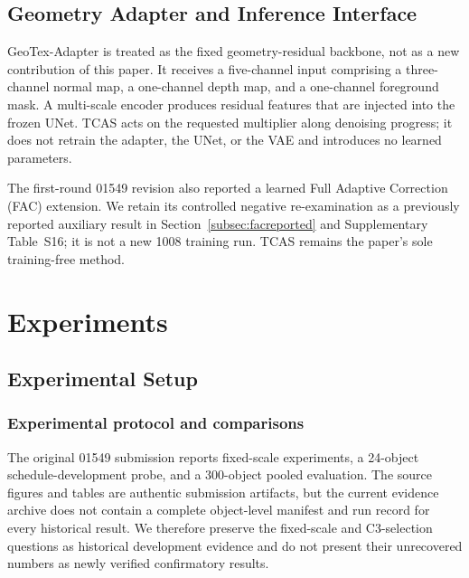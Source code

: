 \documentclass[times,twocolumn,final]{elsarticle}
\begin{document}
\subsection{Geometry Adapter and Inference Interface}
\label{subsec:adapterimpl}

GeoTex-Adapter is treated as the fixed geometry-residual backbone, not as a new contribution of this paper. It receives a five-channel input comprising a three-channel normal map, a one-channel depth map, and a one-channel foreground mask. A multi-scale encoder produces residual features that are injected into the frozen UNet. TCAS acts on the requested multiplier along denoising progress; it does not retrain the adapter, the UNet, or the VAE and introduces no learned parameters.

The first-round 01549 revision also reported a learned Full Adaptive Correction (FAC) extension. We retain its controlled negative re-examination as a previously reported auxiliary result in Section~\ref{subsec:facreported} and Supplementary Table~S16; it is not a new 1008 training run. TCAS remains the paper's sole training-free method.

\section{Experiments}
\label{sec:experiments}

\subsection{Experimental Setup}
\label{subsec:setup}

\subsubsection{Experimental protocol and comparisons}

The original 01549 submission reports fixed-scale experiments, a 24-object schedule-development probe, and a 300-object pooled evaluation. The source figures and tables are authentic submission artifacts, but the current evidence archive does not contain a complete object-level manifest and run record for every historical result. We therefore preserve the fixed-scale and C3-selection questions as historical development evidence and do not present their unrecovered numbers as newly verified confirmatory results.
\end{document}
